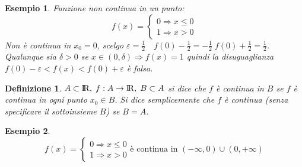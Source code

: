 \documentclass[12pt, a4paper]{article}
\theoremstyle{break}
\newtheorem{definition}{Definizione}[subsection]
\newtheorem{example}{Esempio}[subsection]
\newcommand\R{{\rm I\!R}}
\begin{document}
    \begin{example}
        Funzione non continua in un punto:
        \[f(x) = 
        \begin{cases}
            0 \Rightarrow x\leq 0 \\
            1 \Rightarrow x>0
        \end{cases}\]
        Non è continua in $x_0 = 0$, scelgo $\varepsilon = \frac{1}{2}\quad f(0)-\frac{1}{2} = -\frac{1}{2}\; f(0)+\frac{1}{2} = \frac{1}{2}$.\newline
        Qualunque sia $\delta > 0$ se $x\in (0,\delta) \Rightarrow f(x) = 1$ quindi la disuguaglianza $f(0)-\varepsilon < f(x) < f(0) + \varepsilon$ è falsa. 
        \begin{figure}[!htb]
            \centering
        \end{figure}
    \end{example}
    \newpage
    \begin{definition}
        $A\subset\R,\; f:A\rightarrow\R ,\; B\subset A$ si dice che $f$ è continua in $B$ se $f$ è continua in ogni punto $x_0\in B$.\newline
        Si dice semplicemente che $f$ è continua (senza specificare il sottoinsieme $B$) se $B=A$.
    \end{definition}
    \begin{example}
        \[f(x) = \begin{cases}
            0 \Rightarrow x\leq 0 \\
            1 \Rightarrow x > 0
        \end{cases}
        \text{è continua in } (-\infty,0) \cup (0,+\infty)
        \]
    \end{example}
\end{document}
